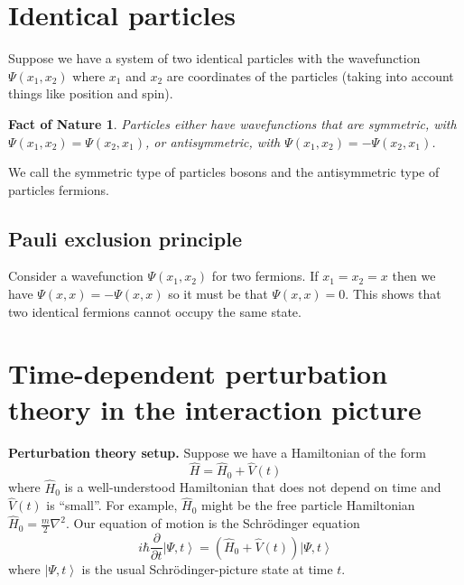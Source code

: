 \documentclass[11pt]{article}
\newcommand{\ket}[1]{\left|#1\right\rangle}
\newcommand{\op}[1]{\hat{#1}}
\theoremstyle{theorem}
\newtheorem{fact}{Fact of Nature}
\theoremstyle{remark}
\theoremstyle{step}
\theoremstyle{gap}
\begin{document}
\section{Identical particles}

Suppose we have a system of two identical particles with the wavefunction \(\Psi(x_1, x_2)\) where \(x_1\) and \(x_2\) are coordinates of the particles (taking into account things like position and spin).

\begin{fact}
Particles either have wavefunctions that are symmetric, with \(\Psi(x_1, x_2) = \Psi(x_2, x_1)\), or antisymmetric, with \(\Psi(x_1, x_2) = -\Psi(x_2, x_1)\).
\end{fact}

We call the symmetric type of particles bosons and the antisymmetric type of particles fermions.

\subsection{Pauli exclusion principle}

Consider a wavefunction \(\Psi(x_1, x_2)\) for two fermions. If \(x_1 = x_2 = x\) then we have \(\Psi(x, x) = - \Psi(x, x)\) so it must be that \(\Psi(x, x) = 0\). This shows that two identical fermions cannot occupy the same state.







\newpage
\section{Time-dependent perturbation theory in the interaction picture}

{\bf Perturbation theory setup.}
Suppose we have a Hamiltonian of the form \[\op{H} = \op{H}_0 + \op{V}(t)\]
where \(\op{H}_0\) is a well-understood Hamiltonian that does not depend on time and \(\op{V}(t)\) is ``small''. For example, \(\op{H}_0\) might be the free particle Hamiltonian \(\op{H}_0 = \frac{m}{2} \nabla^2\). Our equation of motion is the Schr\"odinger equation
\[i \hbar \frac{\partial}{\partial t} \ket{\Psi, t} = \left(\op{H}_0 + \op{V}(t)\right) \ket{\Psi, t}\]
where \(\ket{\Psi, t}\) is the usual Schr\"odinger-picture state at time \(t\).
\end{document}
